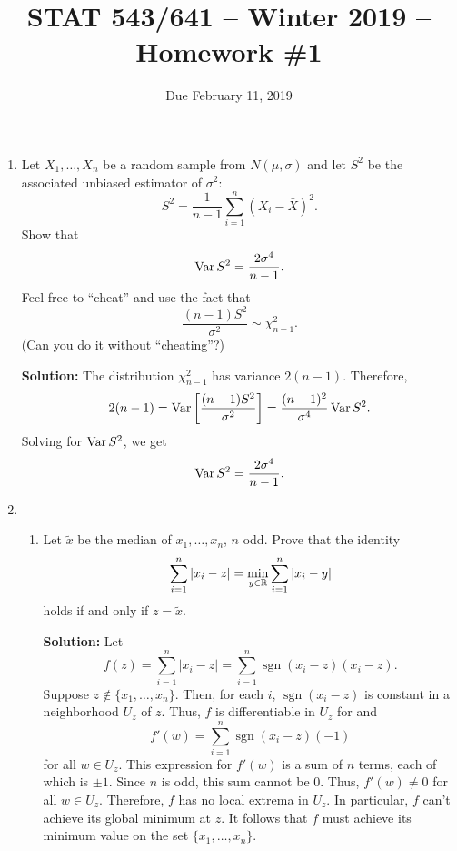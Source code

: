 \documentclass[12pt]{amsart}
\newcommand{\sol}{\bigskip\noindent\textbf{Solution: }}
\DeclareMathOperator{\sgn}{sgn}
\begin{document}
    \title{STAT 543/641 -- Winter 2019 -- Homework \#1}

    \author{Due February 11, 2019}
    \maketitle

    \begin{enumerate}
        \setlength\itemsep{1em}
        \item 
        Let $X_1,\ldots,X_n$ be a random sample from $N(\mu, \sigma)$ and let $S^2$ be
        the associated unbiased estimator of $\sigma^2$:
        \[
            S^2 = \frac1{n-1}\sum_{i=1}^n (X_i-\bar X)^2.
        \]
        Show that
        \[\operatorname{Var} S^2 = \dfrac{2\sigma^4}{n-1}.\]
        Feel free to ``cheat'' and use the fact that
        \[\frac{(n-1)S^2}{\sigma^2}\sim\chi^2_{n-1}.\]
        (Can you do it without ``cheating''?)


        \sol
        The distribution $\chi^2_{n-1}$ has variance $2(n-1)$. Therefore,
        \[
            2(n-1) = \operatorname{Var}\left[\frac{(n-1)S^2}{\sigma^2}\right] = \frac{(n-1)^2}{\sigma^4}\operatorname{Var} S^2.
        \]
        Solving for $\operatorname{Var} S^2$, we get
        \[\operatorname{Var} S^2 = \dfrac{2\sigma^4}{n-1}.\]



        \item 
        \begin{enumerate}
            \setlength{\itemsep}{0.5em}
            \item Let $\tilde{x}$ be the median of $x_1,\ldots,x_n$, $n$ odd. Prove that the identity
            \[\sum_{i=1}^n|x_i-z| = \min_{y\in\mathbb{R}} \sum_{i=1}^n|x_i-y|\]
            holds if and only if $z=\tilde x$.
            
            \sol
            Let
            \[
                f(z) = \sum_{i=1}^n|x_i-z| = \sum_{i=1}^n\sgn(x_i-z)(x_i-z).
            \]
            Suppose $z\notin\{x_1,\ldots,x_n\}$. Then, for each $i$, $\sgn(x_i-z)$ is 
            constant in a neighborhood $U_z$ of $z$. Thus, $f$ is differentiable in $U_z$
            for and
            \[
                f'(w) = \sum_{i=1}^n\sgn(x_i-z)(-1)
            \]
            for all $w\in U_z$. This expression for $f'(w)$ is a sum of $n$ terms, each of which is $\pm 1$.
            Since $n$ is odd, this sum cannot be $0$. Thus, $f'(w)\neq 0$ for all $w\in U_z$.
            Therefore, $f$ has no local extrema in $U_z$.
            In particular, $f$ can't achieve its global minimum at $z$.
            It follows that $f$ must achieve its minimum value on the set $\{x_1,\ldots,x_n\}$.


\end{enumerate}
\end{enumerate}
\end{document}
